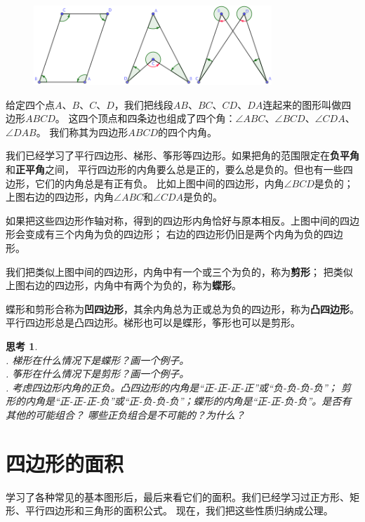\documentclass[12pt,UTF8]{ctexbook}
\newtheorem{sk}{思考}[section]
\begin{document}
\begin{figure}[H] 
    \vspace{4pt}
    \centering
    \includegraphics[width=0.8\textwidth]{tu/凹四边形1.png}
\end{figure}

给定四个点$A$、$B$、$C$、$D$，我们把线段$AB$、$BC$、$CD$、$DA$连起来的图形叫做四边形$ABCD$。
这四个顶点和四条边也组成了四个角：$\angle ABC$、$\angle BCD$、$\angle CDA$、$\angle DAB$。
我们称其为四边形$ABCD$的四个内角。

我们已经学习了平行四边形、梯形、筝形等四边形。如果把角的范围限定在\textbf{负平角}和\textbf{正平角}之间，
平行四边形的内角要么总是正的，要么总是负的。但也有一些四边形，它们的内角总是有正有负。
比如上图中间的四边形，内角$\angle BCD$是负的；上图右边的四边形，内角$\angle ABC$和$\angle CDA$是负的。

如果把这些四边形作轴对称，得到的四边形内角恰好与原本相反。上图中间的四边形会变成有三个内角为负的四边形；
右边的四边形仍旧是两个内角为负的四边形。

我们把类似上图中间的四边形，内角中有一个或三个为负的，称为\textbf{剪形}；
把类似上图右边的四边形，内角中有两个为负的，称为\textbf{蝶形}。

蝶形和剪形合称为\textbf{凹四边形}，其余内角总为正或总为负的四边形，称为\textbf{凸四边形}。
平行四边形总是凸四边形。梯形也可以是蝶形，筝形也可以是剪形。

\begin{sk}\label{sk:5-4-0}
    \mbox{}\\
    . 梯形在什么情况下是蝶形？画一个例子。\\
    . 筝形在什么情况下是剪形？画一个例子。\\
    . 考虑四边形内角的正负。凸四边形的内角是“正-正-正-正”或“负-负-负-负”；
    剪形的内角是“正-正-正-负”或“正-负-负-负”；蝶形的内角是“正-正-负-负”。是否有其他的可能组合？
    哪些正负组合是不可能的？为什么？
\end{sk}

\section{四边形的面积}
学习了各种常见的基本图形后，最后来看它们的面积。我们已经学习过正方形、矩形、平行四边形和三角形的面积公式。
现在，我们把这些性质归纳成公理。
\end{document}
